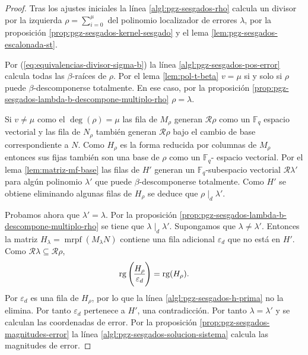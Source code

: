 \begin{proof}
  Tras los ajustes iniciales la línea \ref{algl:pgz-sesgados-rho} calcula un divisor por la izquierda \(\rho = \sum_{i = 0}^{\mu}\) del polinomio localizador de errores \(\lambda\), por la proposición \ref{prop:pgz-sesgados-kernel-sesgado} y el lema \ref{lem:pgz-sesgados-escalonada-st}.
  
  Por (\ref{eq:equivalencias-divisor-sigma-b}) la línea \ref{algl:pgz-sesgados-pos-error} calcula todas las \(\beta\)-raíces de \(\rho\).
  Por el lema \ref{lem:pol-t-beta} \(v = \mu\) si y solo si \(\rho\) puede \(\beta\)-descomponerse totalmente.
  En ese caso, por la proposición \ref{prop:pgz-sesgados-lambda-b-descompone-multiplo-rho} \(\rho = \lambda\).
  
  Si \(v \neq \mu\) como el \(\deg(\rho) = \mu\) las fila de \(M_{\rho}\) generan \(\mathcal R\rho\) como un \(\mathbb F_q\) espacio vectorial y las fila de \(N_{\rho}\) también generan \(\mathcal R\rho\) bajo el cambio de base correspondiente a \(N\).
  Como \(H_{\rho}\) es la forma reducida por columnas de \(M_{\rho}\) entonces sus fijas también son una base de \(\mathcal \rho\) como un \(\mathbb F_q\)- espacio vectorial.
  Por el lema \ref{lem:matriz-mf-base} las filas de \(H'\) generan un \(\mathbb F_q\)-subespacio vectorial \(\mathcal R\lambda'\) para algún polinomio \(\lambda'\) que puede \(\beta\)-descomponerse totalmente.
  Como \(H'\) se obtiene eliminando algunas filas de \(H_{\rho}\) se deduce que \(\rho \mid_d \lambda'\).

  Probamos ahora que \(\lambda' = \lambda\).
  Por la proposición \ref{prop:pgz-sesgados-lambda-b-descompone-multiplo-rho} se tiene que \(\lambda \mid_d \lambda'\).
  Supongamos que \(\lambda \neq \lambda'\).
  Entonces la matriz \(H_{\lambda} = \operatorname{mrpf}(M_{\lambda}N)\) contiene una fila adicional \(\varepsilon_{d}\) que no está en \(H'\).
  Como \(\mathcal R\lambda \subseteq \mathcal R\rho\),
  \[
    \rank\left( \begin{array}{@{}c@{}}
      H_{\rho}\\\hline
      \varepsilon_{d}
    \end{array}\right) = \rank (H_{\rho}).
  \]
  Por \parencite[Lema 2.4]{gomez-torrecillas_petersongorensteinzierler_2018} \(\varepsilon_{d}\) es una fila de \(H_{\rho}\), por lo que la línea \ref{algl:pgz-sesgados-h-prima} no la elimina.
  Por tanto \(\varepsilon_{d}\) pertenece a \(H'\), una contradicción.
  Por tanto \(\lambda = \lambda'\) y se calculan las coordenadas de error.
  Por la proposición \ref{prop:pgz-sesgados-magnitudes-error} la línea \ref{algl:pgz-sesgados-solucion-sistema} calcula las magnitudes de error.
\end{proof}

